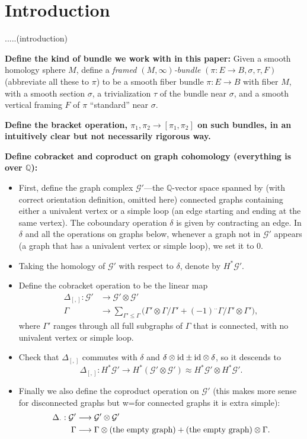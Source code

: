 \documentclass[11pt]{article}
\theoremstyle{definition}
\theoremstyle{remark}
\def\Q{\mathbb{Q}}
\def\cG{\mathcal{G}}
\def\tn#1{\textnormal{#1}}
\begin{document}
\setlength{\parskip}{\baselineskip}
\setlength{\parindent}{0cm}

\section{Introduction}

.....(introduction)

{\bf Define the kind of bundle we work with in this paper:}
Given a smooth homology sphere $M$, define a {\it framed $(M,\infty)$-bundle} $(\pi:E\to B,\sigma, \tau, F)$ (abbreviate all these to $\pi$) to be a smooth fiber bundle $\pi:E\to B$ with fiber $M$, with a smooth section $\sigma$, a trivialization $\tau$ of the bundle near $\sigma$, and a smooth vertical framing $F$ of $\pi$ ``standard'' near $\sigma$. 

{\bf Define the bracket operation, $\pi_1,\pi_2\to[\pi_1,\pi_2]$ on such bundles, in an intuitively clear but not necessarily rigorous way.}

{\bf Define cobracket and coproduct on graph cohomology (everything is over $\Q$):}
\begin{itemize}
\item First, define the graph complex $\cG'$---the $\Q$-vector space spanned by (with correct orientation definition, omitted here) connected graphs containing either a univalent vertex or a simple loop (an edge starting and ending at the same vertex). 
The coboundary operation $\delta$ is given by contracting an edge. 
In $\delta$ and all the operations on graphs below, whenever a graph not in $\cG'$ appears (a graph that has a univalent vertex or simple loop), we set it to 0. 
\item Taking the homology of $\cG'$ with respect to $\delta$, denote by $H^*{\cG'}$. 

\item Define the cobracket operation to be the linear map
\begin{align*}
\Delta_{[,]}: \cG'&\longrightarrow\cG'\otimes\cG'\\
\Gamma&\longrightarrow \sum_{\Gamma'\le\Gamma}\big(\Gamma'\otimes\Gamma/\Gamma'+(-1)^{..}\Gamma/\Gamma'\otimes\Gamma'\big), 
\end{align*}
where $\Gamma'$ ranges through all full subgraphs of $\Gamma$ that is connected, with no univalent vertex or simple loop.
\item Check that $\Delta_{[,]}$ commutes with $\delta$ and $\delta\otimes\tn{id}\pm\tn{id}\otimes\delta$, so it descends to 
$$\Delta_{[,]}: H^*{\cG'}\longrightarrow H^*(\cG'\otimes\cG')\approx H^*{\cG'}\otimes H^*{\cG'}.$$

\item Finally we also define the coproduct operation on $\cG'$ (this makes more sense for disconnected graphs but w=for connected graphs it is extra simple):  
\begin{align*}
\Delta_{\cdot}: \cG'&\longrightarrow \cG'\otimes\cG'\\
\Gamma&\longrightarrow \Gamma\otimes \tn{(the empty graph)} + \tn{(the empty graph)}\otimes\Gamma.
\end{align*}

\end{itemize}
\end{document}
